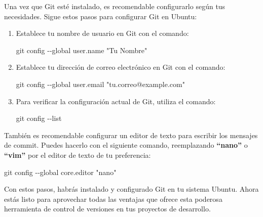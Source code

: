 \documentclass[
  a4paper,
]{article}
\newenvironment{Shaded}{}{}
\newcommand{\AttributeTok}[1]{\textcolor[rgb]{0.84,0.23,0.29}{#1}}
\newcommand{\FunctionTok}[1]{\textcolor[rgb]{0.44,0.26,0.76}{#1}}
\newcommand{\NormalTok}[1]{\textcolor[rgb]{0.14,0.16,0.18}{#1}}
\newcommand{\StringTok}[1]{\textcolor[rgb]{0.01,0.18,0.38}{#1}}
\begin{document}
Una vez que Git esté instalado, es recomendable configurarlo según tus
necesidades. Sigue estos pasos para configurar Git en Ubuntu:

\begin{enumerate}
\def\labelenumi{\arabic{enumi}.}
\item
  Establece tu nombre de usuario en Git con el comando:

\begin{Shaded}
\begin{Highlighting}[]
\FunctionTok{git}\NormalTok{ config }\AttributeTok{{-}{-}global}\NormalTok{ user.name }\StringTok{"Tu Nombre"}
\end{Highlighting}
\end{Shaded}
\item
  Establece tu dirección de correo electrónico en Git con el comando:

\begin{Shaded}
\begin{Highlighting}[]
\FunctionTok{git}\NormalTok{ config }\AttributeTok{{-}{-}global}\NormalTok{ user.email }\StringTok{"tu.correo@example.com"}
\end{Highlighting}
\end{Shaded}
\item
  Para verificar la configuración actual de Git, utiliza el comando:

\begin{Shaded}
\begin{Highlighting}[]
\FunctionTok{git}\NormalTok{ config }\AttributeTok{{-}{-}list}
\end{Highlighting}
\end{Shaded}
\end{enumerate}

También es recomendable configurar un editor de texto para escribir los
mensajes de commit. Puedes hacerlo con el siguiente comando,
reemplazando \textbf{``nano''} o \textbf{``vim''} por el editor de texto
de tu preferencia:

\begin{Shaded}
\begin{Highlighting}[]
\FunctionTok{git}\NormalTok{ config }\AttributeTok{{-}{-}global}\NormalTok{ core.editor }\StringTok{"nano"}
\end{Highlighting}
\end{Shaded}

Con estos pasos, habrás instalado y configurado Git en tu sistema
Ubuntu. Ahora estás listo para aprovechar todas las ventajas que ofrece
esta poderosa herramienta de control de versiones en tus proyectos de
desarrollo.
\end{document}
